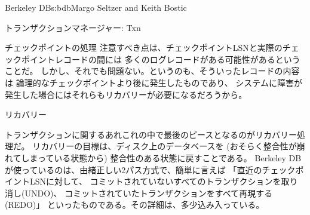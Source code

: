 \begin{aosachapter}{Berkeley DB}{s:bdb}{Margo Seltzer and Keith Bostic}
\begin{aosasect1}{トランザクションマネージャー: Txn}
\begin{aosasect2}{チェックポイントの処理}
注意すべき点は、チェックポイントLSNと実際のチェックポイントレコードの間には
多くのログレコードがある可能性があるということだ。
しかし、それでも問題ない。というのも、そういったレコードの内容は
論理的なチェックポイントより後に発生したものであり、
システムに障害が発生した場合にはそれらもリカバリーが必要になるだろうから。

\end{aosasect2}

\begin{aosasect2}{リカバリー}

トランザクションに関するあれこれの中で最後のピースとなるのがリカバリー処理だ。
リカバリーの目標は、ディスク上のデータベースを
(おそらく整合性が崩れてしまっている状態から)
整合性のある状態に戻すことである。
Berkeley DBが使っているのは、由緒正しい2パス方式で、簡単に言えば
「直近のチェックポイントLSNに対して、
コミットされていないすべてのトランザクションを取り消し(UNDO)、
コミットされていたトランザクションをすべて再現する(REDO)」
といったものである。その詳細は、多少込み入っている。


\end{aosasect2}
\end{aosasect1}
\end{aosachapter}
